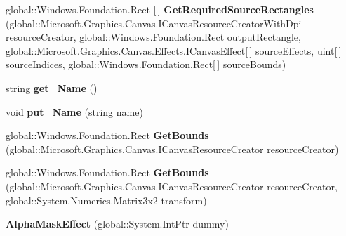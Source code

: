 \begin{DoxyCompactItemize}
\item 
\mbox{\label{class_microsoft_1_1_graphics_1_1_canvas_1_1_effects_1_1_alpha_mask_effect_a41a44ed053b55c7a775d53a00c251ba2}} 
global\+::\+Windows.\+Foundation.\+Rect \mbox{[}$\,$\mbox{]} {\bfseries Get\+Required\+Source\+Rectangles} (global\+::\+Microsoft.\+Graphics.\+Canvas.\+I\+Canvas\+Resource\+Creator\+With\+Dpi resource\+Creator, global\+::\+Windows.\+Foundation.\+Rect output\+Rectangle, global\+::\+Microsoft.\+Graphics.\+Canvas.\+Effects.\+I\+Canvas\+Effect\mbox{[}$\,$\mbox{]} source\+Effects, uint\mbox{[}$\,$\mbox{]} source\+Indices, global\+::\+Windows.\+Foundation.\+Rect\mbox{[}$\,$\mbox{]} source\+Bounds)
\item 
\mbox{\label{class_microsoft_1_1_graphics_1_1_canvas_1_1_effects_1_1_alpha_mask_effect_a3448677e51ee03529f94e407da18c704}} 
string {\bfseries get\+\_\+\+Name} ()
\item 
\mbox{\label{class_microsoft_1_1_graphics_1_1_canvas_1_1_effects_1_1_alpha_mask_effect_a753736b052513c7e68b89275e733180c}} 
void {\bfseries put\+\_\+\+Name} (string name)
\item 
\mbox{\label{class_microsoft_1_1_graphics_1_1_canvas_1_1_effects_1_1_alpha_mask_effect_a3e7d1c877ebadf4041be8671b8317601}} 
global\+::\+Windows.\+Foundation.\+Rect {\bfseries Get\+Bounds} (global\+::\+Microsoft.\+Graphics.\+Canvas.\+I\+Canvas\+Resource\+Creator resource\+Creator)
\item 
\mbox{\label{class_microsoft_1_1_graphics_1_1_canvas_1_1_effects_1_1_alpha_mask_effect_a70f061b97bf107db0b7756816062ec23}} 
global\+::\+Windows.\+Foundation.\+Rect {\bfseries Get\+Bounds} (global\+::\+Microsoft.\+Graphics.\+Canvas.\+I\+Canvas\+Resource\+Creator resource\+Creator, global\+::\+System.\+Numerics.\+Matrix3x2 transform)
\item 
\mbox{\label{class_microsoft_1_1_graphics_1_1_canvas_1_1_effects_1_1_alpha_mask_effect_a001d17c264ef4ec9eb6d42049229603d}} 
{\bfseries Alpha\+Mask\+Effect} (global\+::\+System.\+Int\+Ptr dummy)
\end{DoxyCompactItemize}
